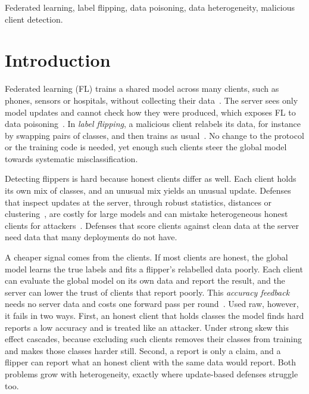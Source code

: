\documentclass[conference]{IEEEtran}
\begin{document}
\begin{IEEEkeywords}
Federated learning, label flipping, data poisoning, data heterogeneity, malicious client detection.
\end{IEEEkeywords}

\section{Introduction}
Federated learning (FL) trains a shared model across many clients, such as phones, sensors or hospitals, without collecting their data~\cite{fedavg-pmlr-v54-mcmahan17a,kairouz2021advances}. The server sees only model updates and cannot check how they were produced, which exposes FL to data poisoning~\cite{lyu2020threats}. In \emph{label flipping}, a malicious client relabels its data, for instance by swapping pairs of classes, and then trains as usual~\cite{biggio2011support,tolpegin2020data}. No change to the protocol or the training code is needed, yet enough such clients steer the global model towards systematic misclassification.

Detecting flippers is hard because honest clients differ as well. Each client holds its own mix of classes, and an unusual mix yields an unusual update. Defenses that inspect updates at the server, through robust statistics, distances or clustering~\cite{yin2018byzantine,NIPS2017_f4b9ec30,nguyen2022flame,jebreel2024lfighter}, are costly for large models and can mistake heterogeneous honest clients for attackers~\cite{li2023hscs,shen2024lfrppfl}. Defenses that score clients against clean data at the server~\cite{cao2020fltrust} need data that many deployments do not have.

A cheaper signal comes from the clients. If most clients are honest, the global model learns the true labels and fits a flipper's relabelled data poorly. Each client can evaluate the global model on its own data and report the result, and the server can lower the trust of clients that report poorly. This \emph{accuracy feedback} needs no server data and costs one forward pass per round~\cite{andreina2021baffle,jiang2023dataquality}. Used raw, however, it fails in two ways. First, an honest client that holds classes the model finds hard reports a low accuracy and is treated like an attacker. Under strong skew this effect cascades, because excluding such clients removes their classes from training and makes those classes harder still. Second, a report is only a claim, and a flipper can report what an honest client with the same data would report. Both problems grow with heterogeneity, exactly where update-based defenses struggle too.
\end{document}
